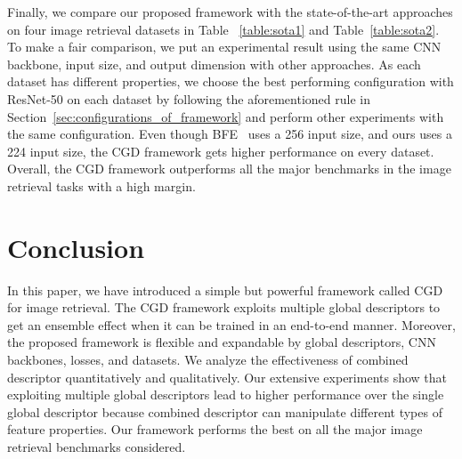 \documentclass[10pt,twocolumn,letterpaper]{article}
\begin{document}
\begin{CJK}{UTF8}{mj}
Finally, we compare our proposed framework with the state-of-the-art approaches on four image retrieval datasets in Table ~\ref{table:sota1} and Table~\ref{table:sota2}.
To make a fair comparison, we put an experimental result using the same CNN backbone, input size, and output dimension with other approaches.
As each dataset has different properties, we choose the best performing configuration with ResNet-50 on each dataset by following the aforementioned rule in Section~\ref{sec:configurations_of_framework} and perform other experiments with the same configuration.
Even though BFE~\cite{dai2018batch} uses a 256 input size, and ours uses a 224 input size, the CGD framework gets higher performance on every dataset.
Overall, the CGD framework outperforms all the major benchmarks in the image retrieval tasks with a high margin.

\section{Conclusion}

In this paper, we have introduced a simple but powerful framework called CGD for image retrieval.
The CGD framework exploits multiple global descriptors to get an ensemble effect when it can be trained in an end-to-end manner.
Moreover, the proposed framework is flexible and expandable by global descriptors, CNN backbones, losses, and datasets.
We analyze the effectiveness of combined descriptor quantitatively and qualitatively.
Our extensive experiments show that exploiting multiple global descriptors lead to higher performance over the single global descriptor because combined descriptor can manipulate different types of feature properties.
Our framework performs the best on all the major image retrieval benchmarks considered.




{\small


}

\end{CJK}
\end{document}
